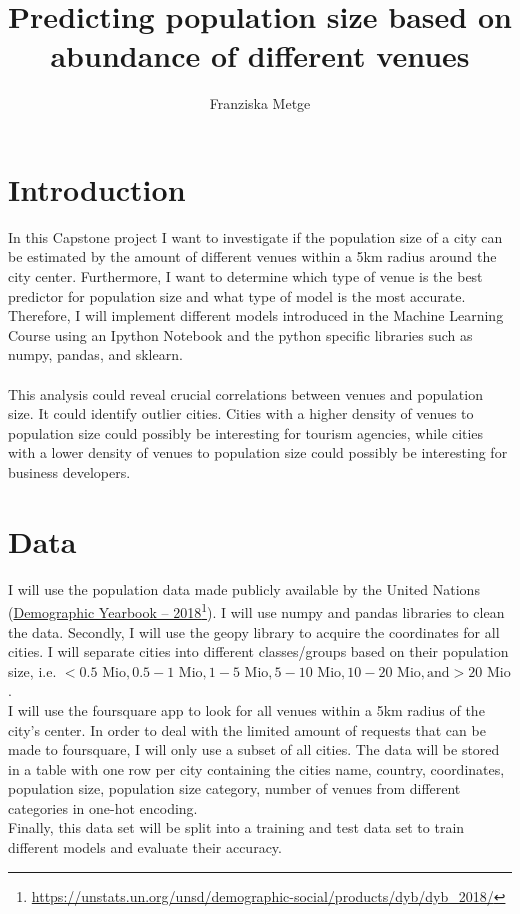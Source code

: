 \documentclass[11pt,a4paper,final]{article}
\author{Franziska Metge}
\title{Predicting population size based on abundance of different venues}
\begin{document}
\maketitle
\section{Introduction}
In this Capstone project I want to investigate if the population size of a city can be estimated by the amount of different venues within a 5km radius around the city center. Furthermore, I want to determine which type of venue is the best predictor for population size and what type of model is the most accurate. Therefore, I will implement different models introduced in the Machine Learning Course using an Ipython Notebook and the python specific libraries such as numpy, pandas, and sklearn.\\\\
This analysis could reveal crucial correlations between venues and population size. It could identify outlier cities. Cities with a higher density of venues to population size could possibly be interesting for tourism agencies, while cities with a lower density of venues to population size could possibly be interesting for business developers.\\

\section{Data}
I will use the population data made publicly available by the United Nations (\href{https://unstats.un.org/unsd/demographic-social/products/dyb/documents/DYB2018/table08.xls}{Demographic Yearbook – 2018}\footnote{\url{https://unstats.un.org/unsd/demographic-social/products/dyb/dyb_2018/}}). I will use numpy and pandas libraries to clean the data. Secondly, I will use the geopy library to acquire the coordinates for all cities. I will separate cities into different classes/groups based on their population size, i.e. $ < 0.5\text{ Mio}, 0.5-1\text{ Mio}, 1-5\text{ Mio}, 5-10\text{ Mio}, 10-20\text{ Mio}, \text{and} >20\text{ Mio}$.\\
I will use the foursquare app to look for all venues within a 5km radius of the city's center. In order to deal with the limited amount of requests that can be made to foursquare, I will only use a subset of all cities. The data will be stored in a table with one row per city containing the cities name, country, coordinates, population size, population size category, number of venues from different categories in one-hot encoding.\\
Finally, this data set will be split into a training and test data set to train different models and evaluate their accuracy.
\end{document}
